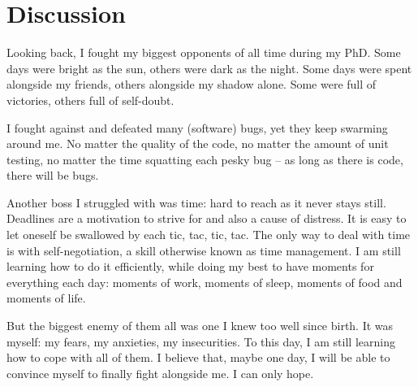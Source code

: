 \chapter{Discussion}

Looking back, I fought my biggest opponents of all time during my PhD. Some days were bright as the sun, others were dark as the night. Some days were spent alongside my friends, others alongside my shadow alone. Some were full of victories, others full of self-doubt.

I fought against and defeated many (software) bugs, yet they keep swarming around me. No matter the quality of the code, no matter the amount of unit testing, no matter the time squatting each pesky bug -- as long as there is code, there will be bugs.

Another boss I struggled with was time: hard to reach as it never stays still. Deadlines are a motivation to strive for and also a cause of distress. It is easy to let oneself be swallowed by each tic, tac, tic, tac. The only way to deal with time is with self-negotiation, a skill otherwise known as time management. I am still learning how to do it efficiently, while doing my best to have moments for everything each day: moments of work, moments of sleep, moments of food and moments of life.

But the biggest enemy of them all was one I knew too well since birth. It was myself: my fears, my anxieties, my insecurities. To this day, I am still learning how to cope with all of them. I believe that, maybe one day, I will be able to convince myself to finally fight alongside me. I can only hope.